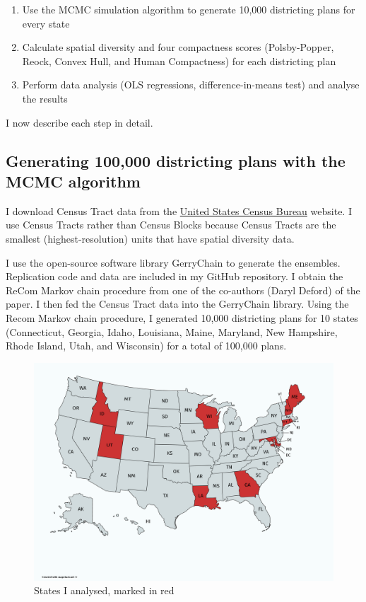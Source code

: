 \documentclass[]{article}
\providecommand{\tightlist}{%
  \setlength{\itemsep}{0pt}\setlength{\parskip}{0pt}}
\begin{document}
\begin{enumerate}
\def\labelenumi{\arabic{enumi}.}
\tightlist
\item
  Use the MCMC simulation algorithm to generate 10,000 districting plans
  for every state
\item
  Calculate spatial diversity and four compactness scores
  (Polsby-Popper, Reock, Convex Hull, and Human Compactness) for each
  districting plan
\item
  Perform data analysis (OLS regressions, difference-in-means test) and
  analyse the results
\end{enumerate}

I now describe each step in detail.

\hypertarget{generating-100000-districting-plans-with-the-mcmc-algorithm}{%
\subsection{Generating 100,000 districting plans with the MCMC
algorithm}\label{generating-100000-districting-plans-with-the-mcmc-algorithm}}

I download Census Tract data from the \href{census.gov}{United States
Census Bureau} website. I use Census Tracts rather than Census Blocks
because Census Tracts are the smallest (highest-resolution) units that
have spatial diversity data.

I use the open-source software library GerryChain to generate the
ensembles. Replication code and data are included in my GitHub
repository. I obtain the ReCom Markov chain procedure from one of the
co-authors (Daryl Deford) of the \cite{ddj2019recom} paper. I then fed
the Census Tract data into the GerryChain library. Using the Recom
Markov chain procedure, I generated 10,000 districting plans for 10
states (Connecticut, Georgia, Idaho, Louisiana, Maine, Maryland, New
Hampshire, Rhode Island, Utah, and Wisconsin) for a total of 100,000
plans.

\begin{figure}
\centering
\includegraphics{./img/states_analysed.png}
\caption{States I analysed, marked in red \label{states_analysed}}
\end{figure}
\end{document}
